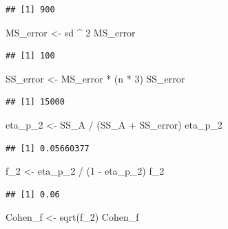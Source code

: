 \documentclass[
]{book}
\newenvironment{Shaded}{\begin{snugshade}}{\end{snugshade}}
\newcommand{\DecValTok}[1]{\textcolor[rgb]{0.00,0.00,0.81}{#1}}
\newcommand{\FunctionTok}[1]{\textcolor[rgb]{0.00,0.00,0.00}{#1}}
\newcommand{\NormalTok}[1]{#1}
\newcommand{\OtherTok}[1]{\textcolor[rgb]{0.56,0.35,0.01}{#1}}
\newcommand{\SpecialCharTok}[1]{\textcolor[rgb]{0.00,0.00,0.00}{#1}}
\begin{document}
\begin{verbatim}
## [1] 900
\end{verbatim}

\begin{Shaded}
\begin{Highlighting}[]
\NormalTok{MS\_error }\OtherTok{\textless{}{-}}\NormalTok{ sd }\SpecialCharTok{\^{}} \DecValTok{2}
\NormalTok{MS\_error}
\end{Highlighting}
\end{Shaded}

\begin{verbatim}
## [1] 100
\end{verbatim}

\begin{Shaded}
\begin{Highlighting}[]
\NormalTok{SS\_error }\OtherTok{\textless{}{-}}\NormalTok{ MS\_error }\SpecialCharTok{*}\NormalTok{ (n }\SpecialCharTok{*} \DecValTok{3}\NormalTok{)}
\NormalTok{SS\_error}
\end{Highlighting}
\end{Shaded}

\begin{verbatim}
## [1] 15000
\end{verbatim}

\begin{Shaded}
\begin{Highlighting}[]
\NormalTok{eta\_p\_2 }\OtherTok{\textless{}{-}}\NormalTok{ SS\_A }\SpecialCharTok{/}\NormalTok{ (SS\_A }\SpecialCharTok{+}\NormalTok{ SS\_error)}
\NormalTok{eta\_p\_2}
\end{Highlighting}
\end{Shaded}

\begin{verbatim}
## [1] 0.05660377
\end{verbatim}

\begin{Shaded}
\begin{Highlighting}[]
\NormalTok{f\_2 }\OtherTok{\textless{}{-}}\NormalTok{ eta\_p\_2 }\SpecialCharTok{/}\NormalTok{ (}\DecValTok{1} \SpecialCharTok{{-}}\NormalTok{ eta\_p\_2)}
\NormalTok{f\_2}
\end{Highlighting}
\end{Shaded}

\begin{verbatim}
## [1] 0.06
\end{verbatim}

\begin{Shaded}
\begin{Highlighting}[]
\NormalTok{Cohen\_f }\OtherTok{\textless{}{-}} \FunctionTok{sqrt}\NormalTok{(f\_2)}
\NormalTok{Cohen\_f}
\end{Highlighting}
\end{Shaded}
\end{document}
